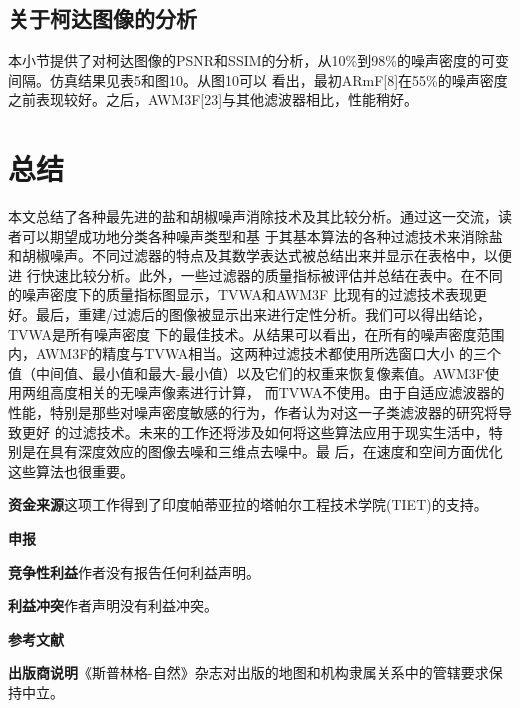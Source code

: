 \documentclass[12pt]{article} %
\begin{document}
\subsection{关于柯达图像的分析}
本小节提供了对柯达图像的PSNR和SSIM的分析，从10\%到98\%的噪声密度的可变间隔。仿真结果见表5和图10。从图10可以
看出，最初ARmF[8]在55\%的噪声密度之前表现较好。之后，AWM3F[23]与其他滤波器相比，性能稍好。

\section{总结\label{sec:5}}
本文总结了各种最先进的盐和胡椒噪声消除技术及其比较分析。通过这一交流，读者可以期望成功地分类各种噪声类型和基
于其基本算法的各种过滤技术来消除盐和胡椒噪声。不同过滤器的特点及其数学表达式被总结出来并显示在表格中，以便进
行快速比较分析。此外，一些过滤器的质量指标被评估并总结在表中。在不同的噪声密度下的质量指标图显示，TVWA和AWM3F
比现有的过滤技术表现更好。最后，重建/过滤后的图像被显示出来进行定性分析。我们可以得出结论，TVWA是所有噪声密度
下的最佳技术。从结果可以看出，在所有的噪声密度范围内，AWM3F的精度与TVWA相当。这两种过滤技术都使用所选窗口大小
的三个值（中间值、最小值和最大-最小值）以及它们的权重来恢复像素值。AWM3F使用两组高度相关的无噪声像素进行计算，
而TVWA不使用。由于自适应滤波器的性能，特别是那些对噪声密度敏感的行为，作者认为对这一子类滤波器的研究将导致更好
的过滤技术。未来的工作还将涉及如何将这些算法应用于现实生活中，特别是在具有深度效应的图像去噪和三维点去噪中。最
后，在速度和空间方面优化这些算法也很重要。

\vspace{1em}

\textbf{资金来源}\hspace{2em}这项工作得到了印度帕蒂亚拉的塔帕尔工程技术学院(TIET)的支持。

\vspace{1em}

\textbf{申报}

\vspace{1em}

\textbf{竞争性利益}\hspace{2em}作者没有报告任何利益声明。

\vspace{1em}

\textbf{利益冲突}\hspace{2em}作者声明没有利益冲突。

\vspace{1em}

\textbf{参考文献}

\printbibliography

\textbf{出版商说明}\hspace{2em}《斯普林格-自然》杂志对出版的地图和机构隶属关系中的管辖要求保持中立。
\end{document}
